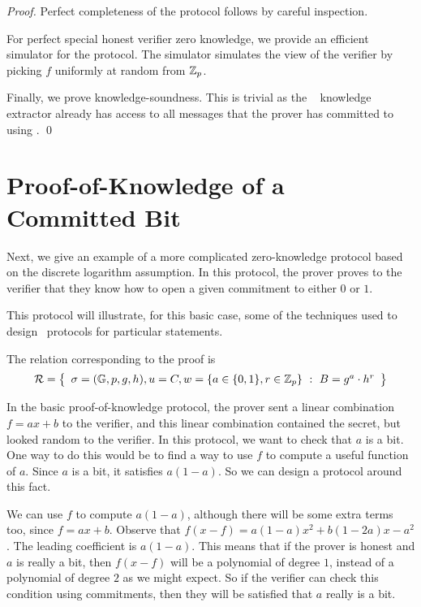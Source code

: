 \begin{proof}
Perfect completeness of the protocol follows by careful inspection.

For perfect special honest verifier zero knowledge, we provide an efficient simulator for the protocol. The simulator simulates the view of the verifier by picking $f$ uniformly at random from $\mathbb{Z}_p$.

Finally, we prove knowledge-soundness. This is trivial as the \ILC~ knowledge extractor already has access to all messages that the prover has committed to using \ILCcommit. \qed
\end{proof}

\section{Proof-of-Knowledge of a Committed Bit}\label{sec:combits}

Next, we give an example of a more complicated zero-knowledge protocol based on the discrete logarithm assumption. In this protocol, the prover proves to the verifier that they know how to open a given commitment to either $0$ or $1$.

This protocol will illustrate, for this basic case, some of the techniques used to design \ILC\ protocols for particular statements.

The relation corresponding to the proof is
\[
\mathcal{R} =\left\{\begin{array}{c}
\mathsf{\sigma} = (\mathbb{G},p,g,h), 
u = C,
w = \lbrace a \in \lbrace 0,1 \rbrace, r \in \mathbb{Z}_p \rbrace \ : \
B = g^a \cdot h^r
\end{array}\right\}
\]

In the basic proof-of-knowledge protocol, the prover sent a linear combination $f = ax+b$ to the verifier, and this linear combination contained the secret, but looked random to the verifier. In this protocol, we want to check that $a$ is a bit. One way to do this would be to find a way to use $f$ to compute a useful function of $a$. Since $a$ is a bit, it satisfies $a(1-a)$. So we can design a protocol around this fact.

We can use $f$ to compute $a(1-a)$, although there will be some extra terms too, since $f = ax+b$. Observe that $f(x-f) = a(1-a) x^2 + b(1-2a) x - a^2$. The leading coefficient is $a(1-a)$. This means that if the prover is honest and $a$ is really a bit, then $f(x-f)$ will be a polynomial of degree $1$, instead of a polynomial of degree $2$ as we might expect. So if the verifier can check this condition using commitments, then they will be satisfied that $a$ really is a bit.

